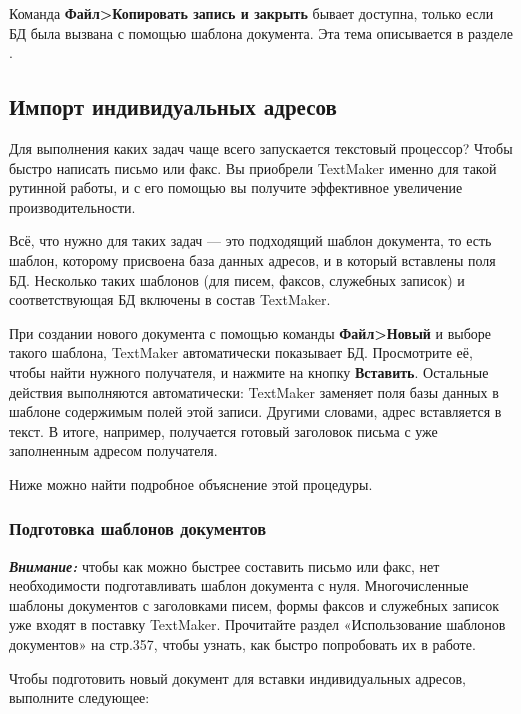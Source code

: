 ﻿\documentclass[a4paper,10pt]{article}
\begin{document}
Команда \textbf{Файл>Копировать запись и закрыть} бывает доступна, только если БД была вызвана с помощью шаблона документа. Эта тема описывается в разделе .

\subsection{Импорт индивидуальных адресов} \label{sec:импортиндивадресов}
Для выполнения каких задач чаще всего запускается текстовый процессор? Чтобы быстро написать письмо или факс. Вы приобрели TextMaker именно для такой рутинной работы, и с его помощью вы получите эффективное увеличение производительности.

Всё, что нужно для таких задач — это подходящий шаблон документа, то есть шаблон, которому присвоена база данных адресов, и в который вставлены поля БД. Несколько таких шаблонов (для писем, факсов, служебных записок) и соответствующая БД включены в состав TextMaker.

При создании нового документа с помощью команды \textbf{Файл>Новый} и выборе такого шаблона, TextMaker автоматически показывает БД. Просмотрите её, чтобы найти нужного получателя, и нажмите на кнопку \textbf{Вставить}. Остальные действия выполняются автоматически: TextMaker заменяет поля базы данных в шаблоне содержимым полей этой записи. Другими словами, адрес вставляется в текст. В итоге, например, получается готовый заголовок письма с уже заполненным адресом получателя.

Ниже можно найти подробное объяснение этой процедуры.

\subsubsection{Подготовка шаблонов документов}
\begin{mdframed}[backgroundcolor=blue!10]
\textbf{\textit{Внимание:}} чтобы как можно быстрее составить письмо или факс, нет необходимости подготавливать шаблон документа с нуля. Многочисленные шаблоны документов с заголовками писем, формы факсов и служебных записок уже входят в поставку TextMaker. Прочитайте раздел «Использование шаблонов документов» на стр.357, чтобы узнать, как быстро попробовать их в работе.
\end{mdframed}

Чтобы подготовить новый документ для вставки индивидуальных адресов, выполните следующее:
\end{document}
